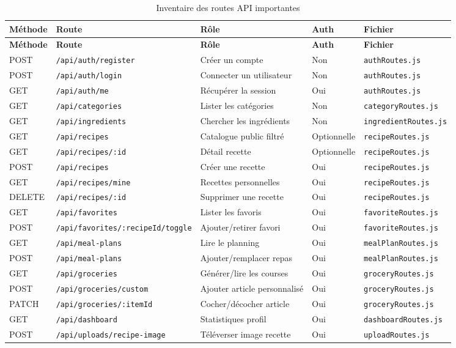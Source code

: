 \documentclass[12pt,a4paper]{report}
\begin{document}
\begin{longtable}{p{1.4cm}p{3.5cm}p{4.4cm}p{2cm}p{3.1cm}}
\caption{Inventaire des routes API importantes}\label{tab:routes}\\
\toprule
\textbf{Méthode} & \textbf{Route} & \textbf{Rôle} & \textbf{Auth} & \textbf{Fichier} \\
\midrule
\endfirsthead
\toprule
\textbf{Méthode} & \textbf{Route} & \textbf{Rôle} & \textbf{Auth} & \textbf{Fichier} \\
\midrule
\endhead
POST & \texttt{/api/auth/register} & Créer un compte & Non & \texttt{authRoutes.js} \\
POST & \texttt{/api/auth/login} & Connecter un utilisateur & Non & \texttt{authRoutes.js} \\
GET & \texttt{/api/auth/me} & Récupérer la session & Oui & \texttt{authRoutes.js} \\
GET & \texttt{/api/categories} & Lister les catégories & Non & \texttt{categoryRoutes.js} \\
GET & \texttt{/api/ingredients} & Chercher les ingrédients & Non & \texttt{ingredientRoutes.js} \\
GET & \texttt{/api/recipes} & Catalogue public filtré & Optionnelle & \texttt{recipeRoutes.js} \\
GET & \texttt{/api/recipes/:id} & Détail recette & Optionnelle & \texttt{recipeRoutes.js} \\
POST & \texttt{/api/recipes} & Créer une recette & Oui & \texttt{recipeRoutes.js} \\
GET & \texttt{/api/recipes/mine} & Recettes personnelles & Oui & \texttt{recipeRoutes.js} \\
DELETE & \texttt{/api/recipes/:id} & Supprimer une recette & Oui & \texttt{recipeRoutes.js} \\
GET & \texttt{/api/favorites} & Lister les favoris & Oui & \texttt{favoriteRoutes.js} \\
POST & \texttt{/api/favorites/:recipeId/toggle} & Ajouter/retirer favori & Oui & \texttt{favoriteRoutes.js} \\
GET & \texttt{/api/meal-plans} & Lire le planning & Oui & \texttt{mealPlanRoutes.js} \\
POST & \texttt{/api/meal-plans} & Ajouter/remplacer repas & Oui & \texttt{mealPlanRoutes.js} \\
GET & \texttt{/api/groceries} & Générer/lire les courses & Oui & \texttt{groceryRoutes.js} \\
POST & \texttt{/api/groceries/custom} & Ajouter article personnalisé & Oui & \texttt{groceryRoutes.js} \\
PATCH & \texttt{/api/groceries/:itemId} & Cocher/décocher article & Oui & \texttt{groceryRoutes.js} \\
GET & \texttt{/api/dashboard} & Statistiques profil & Oui & \texttt{dashboardRoutes.js} \\
POST & \texttt{/api/uploads/recipe-image} & Téléverser image recette & Oui & \texttt{uploadRoutes.js} \\
\bottomrule
\end{longtable}
\end{document}
